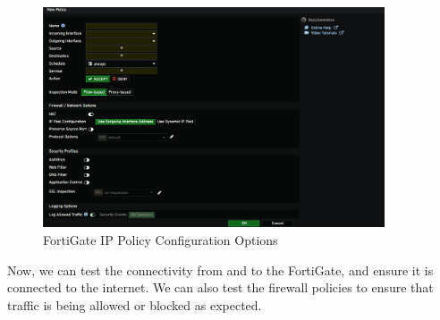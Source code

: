 \documentclass[12pt]{report}
\begin{document}
\begin{figure}
    \centering
    \includegraphics[width=0.9\textwidth]{images/Implementation/ippolicyoptions.png}
    \caption{FortiGate IP Policy Configuration Options}
    \label{fig:ippolicyoptions}
\end{figure}
Now, we can test the connectivity from and to the FortiGate, and ensure it is connected to the internet. We can also test the firewall policies to ensure that traffic is being allowed or blocked as expected.
\end{document}
